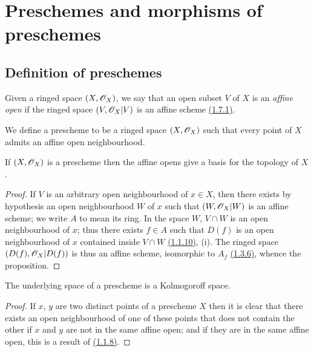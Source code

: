 \section{Preschemes and morphisms of preschemes}
\label{section-preschemes-and-morphisms}

\subsection{Definition of preschemes}
\label{subsection-preschemes-definition}

\begin{env}[2.1.1]
\label{env-1.2.1.1}
Given a ringed space $(X,\mathscr{O}_X)$, we say that an open subset
$V$ of $X$ is an {\it affine open} if the ringed space $(V,\mathscr{O}_X|V)$ is an
affine scheme \hyperref[defn-1.1.7.1]{(1.7.1)}.
\end{env}

\begin{defn}[2.1.2]
\label{defn-1.2.1.2}
We define a prescheme to be a ringed space
$(X,\mathscr{O}_X)$ such that every point of $X$ admits an affine open neighbourhood.
\end{defn}

\begin{prop}[2.1.3]
\label{prop-1.2.1.3}
If $(X,\mathscr{O}_X)$ is a prescheme then the affine opens give a basis for the topology of $X$.
\end{prop}

\begin{proof}
\label{proof-prop-1.2.1.3}
If $V$ is an arbitrary open neighbourhood of $x\in X$, then there
exists by hypothesis an open neighbourhood $W$ of $x$ such that $(W,\mathscr{O}_X|W)$ is
an affine scheme; we write $A$ to mean its ring. In the space $W$, $V\cap W$ is
an open neighbourhood of $x$; thus there exists $f\in A$ such that $D(f)$ is an
open neighbourhood of $x$ contained inside $V\cap W$ \hyperref[prop-1.1.1.10]{(1.1.10)}, (i).
The ringed space $(D(f),\mathscr{O}_X|D(f))$ is thus an affine scheme, isomorphic to $A_f$
\hyperref[prop-1.1.3.6]{(1.3.6)}, whence the proposition.
\end{proof}

\begin{prop}[2.1.4]
\label{prop-1.2.1.4}
The underlying space of a prescheme is a Kolmogoroff space.
\end{prop}

\begin{proof}
\label{proof-prop-1.2.1.4}
If $x$, $y$ are two distinct points of a prescheme $X$ then it is clear
that there exists an open neighbourhood of one of these points that does not
contain the other if $x$ and $y$ are not in the same affine open; and if they
are in the same affine open, this is a result of \hyperref[cor-1.1.1.8]{(1.1.8)}.
\end{proof}

